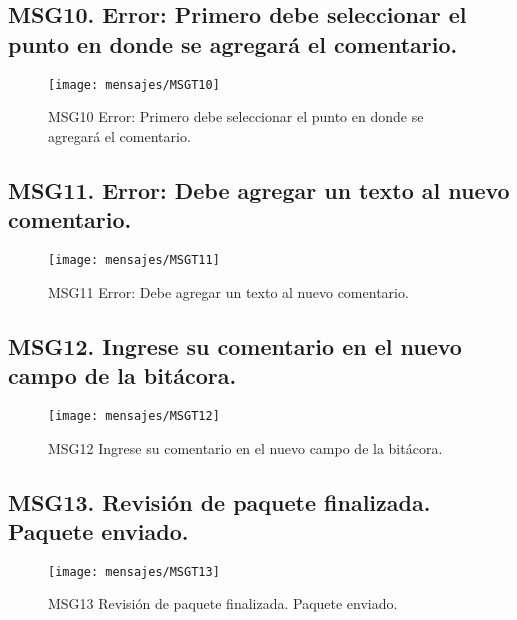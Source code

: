\subsection{MSG10. Error: Primero debe seleccionar el punto en donde se agregará el comentario.}
    \begin{figure}[htbp]
        \begin{center}
            \texttt{[image: mensajes/MSGT10]}
            \caption{MSG10 Error: Primero debe seleccionar el punto en donde se agregará el comentario.}
            \label{fig:MSG10}
        \end{center}
    \end{figure}

\subsection{MSG11. Error: Debe agregar un texto al nuevo comentario.}
    \begin{figure}[htbp]
        \begin{center}
            \texttt{[image: mensajes/MSGT11]}
            \caption{MSG11 Error: Debe agregar un texto al nuevo comentario.}
            \label{fig:MSG11}
        \end{center}
    \end{figure}

\subsection{MSG12. Ingrese su comentario en el nuevo campo de la bitácora.}
    \begin{figure}[htbp]
        \begin{center}
            \texttt{[image: mensajes/MSGT12]}
            \caption{MSG12 Ingrese su comentario en el nuevo campo de la bitácora.}
            \label{fig:MSG12}
        \end{center}
    \end{figure}

\subsection{MSG13. Revisión de paquete finalizada. Paquete enviado.}
    \begin{figure}[htbp]
        \begin{center}
            \texttt{[image: mensajes/MSGT13]}
            \caption{MSG13 Revisión de paquete finalizada. Paquete enviado.}
            \label{fig:MSG13}
        \end{center}
    \end{figure}

